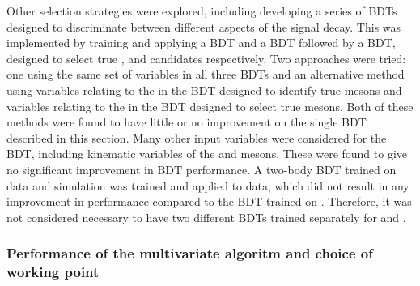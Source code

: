 
Other selection strategies were explored, including developing a series of BDTs designed to discriminate between different aspects of the signal decay. This was implemented by training and applying a \KS BDT and a \Dz BDT followed by a \Bm BDT, designed to select true \KS, \Dz and \B candidates respectively. Two approaches were tried: one using the same set of variables in all three BDTs and an alternative method using variables relating to the \KS in the BDT designed to identify true \KS mesons and variables relating to the \Dz in the BDT designed to select true \Dz mesons. Both of these methods were found to have little or no improvement on the single BDT described in this section. Many other input variables were considered for the BDT, including kinematic variables of the \Bm and \Dz mesons. These were found to give no significant improvement in BDT performance. A two-body BDT trained on \runtwo data and simulation was trained and applied to \runtwo data, which did not result in any improvement in performance compared to the BDT trained on \runone. Therefore, it was not considered necessary to have two different BDTs trained separately for \runone and \runtwo.

\subsubsection{Performance of the multivariate algoritm and choice of working point}


